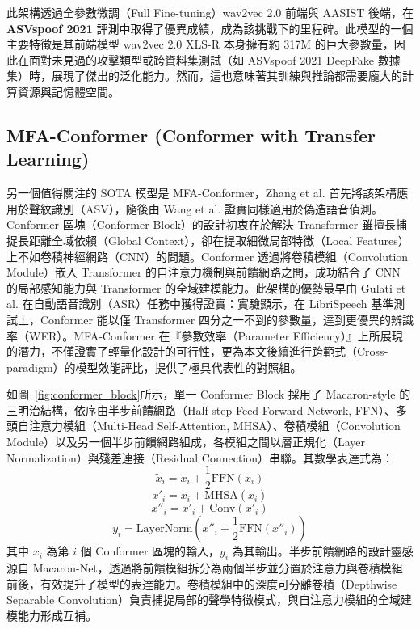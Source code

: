 此架構透過全參數微調（Full Fine-tuning）wav2vec 2.0 前端與 AASIST 後端，在 \textbf{ASVspoof 2021} 評測中取得了優異成績，成為該挑戰下的里程碑。此模型的一個主要特徵是其前端模型 wav2vec 2.0 XLS-R 本身擁有約 317M 的巨大參數量，因此在面對未見過的攻擊類型或跨資料集測試（如 ASVspoof 2021 DeepFake 數據集）時，展現了傑出的泛化能力。然而，這也意味著其訓練與推論都需要龐大的計算資源與記憶體空間。

\subsection{MFA-Conformer (Conformer with Transfer Learning)}

另一個值得關注的 SOTA 模型是 MFA-Conformer，Zhang et al. \cite{zhang2022mfaconformer} 首先將該架構應用於聲紋識別（ASV），隨後由 Wang et al. \cite{wang2023pretraining} 證實同樣適用於偽造語音偵測。Conformer 區塊（Conformer Block）的設計初衷在於解決 Transformer 雖擅長捕捉長距離全域依賴（Global Context），卻在提取細微局部特徵（Local Features）上不如卷積神經網路（CNN）的問題。Conformer 透過將卷積模組（Convolution Module）嵌入 Transformer 的自注意力機制與前饋網路之間，成功結合了 CNN 的局部感知能力與 Transformer 的全域建模能力。此架構的優勢最早由 Gulati et al. \cite{gulati2020conformer} 在自動語音識別（ASR）任務中獲得證實：實驗顯示，在 LibriSpeech 基準測試上，Conformer 能以僅 Transformer 四分之一不到的參數量，達到更優異的辨識率（WER）。MFA-Conformer 在『參數效率（Parameter Efficiency）』上所展現的潛力，不僅證實了輕量化設計的可行性，更為本文後續進行跨範式（Cross-paradigm）的模型效能評比，提供了極具代表性的對照組。

如圖~\ref{fig:conformer_block}所示，單一 Conformer Block 採用了 Macaron-style 的三明治結構，依序由半步前饋網路（Half-step Feed-Forward Network, FFN）、多頭自注意力模組（Multi-Head Self-Attention, MHSA）、卷積模組（Convolution Module）以及另一個半步前饋網路組成，各模組之間以層正規化（Layer Normalization）與殘差連接（Residual Connection）串聯。其數學表達式為：
\begin{equation}
\tilde{x}_i = x_i + \frac{1}{2} \text{FFN}(x_i)
\end{equation}
\begin{equation}
x'_i = \tilde{x}_i + \text{MHSA}(\tilde{x}_i)
\end{equation}
\begin{equation}
x''_i = x'_i + \text{Conv}(x'_i)
\end{equation}
\begin{equation}
y_i = \text{LayerNorm}\left(x''_i + \frac{1}{2} \text{FFN}(x''_i)\right)
\end{equation}
其中 $x_i$ 為第 $i$ 個 Conformer 區塊的輸入，$y_i$ 為其輸出。半步前饋網路的設計靈感源自 Macaron-Net，透過將前饋模組拆分為兩個半步並分置於注意力與卷積模組前後，有效提升了模型的表達能力。卷積模組中的深度可分離卷積（Depthwise Separable Convolution）負責捕捉局部的聲學特徵模式，與自注意力模組的全域建模能力形成互補。

